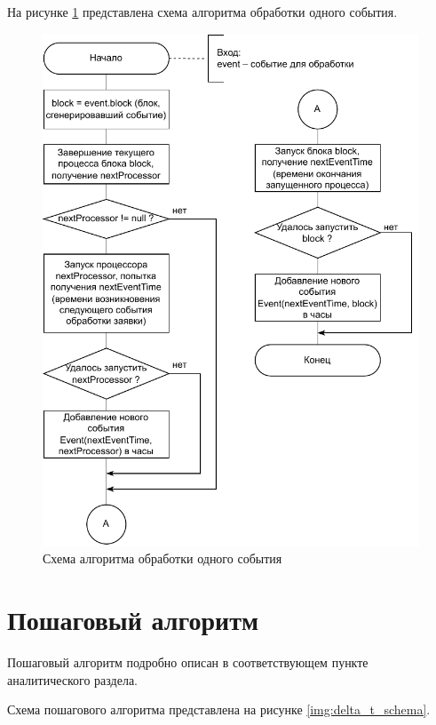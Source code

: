 \clearpage
На рисунке \ref{img:hybrid_processEvent_schema} представлена схема алгоритма обработки одного события.
\begin{figure}[h!btp]
	\centering
	\includegraphics[width=0.8\columnwidth]{inc/img/hybrid_processEvent_schema.pdf}
	\caption{Схема алгоритма обработки одного события}
	\label{img:hybrid_processEvent_schema}	
\end{figure}


\section{Пошаговый алгоритм}
Пошаговый алгоритм подробно описан в соответствующем пункте аналитического раздела. 

Схема пошагового алгоритма представлена на рисунке \ref{img:delta_t_schema}.

